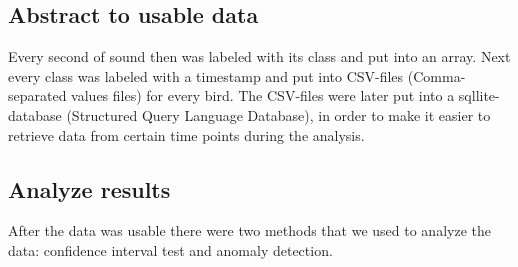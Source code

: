 \documentclass[a4paper]{article}
\begin{document}
\subsection*{Abstract to usable data}
Every second of sound then was labeled with its class and put into an array. Next every class was labeled with a timestamp and put into CSV-files (Comma-separated values files) for every bird. The CSV-files were later put into a sqllite-database (Structured Query Language Database), in order to make it easier to retrieve data from certain time points during the analysis.

\subsection*{Analyze results}
After the data was usable there were two methods that we used to analyze the data: confidence interval test and anomaly detection.
\end{document}
